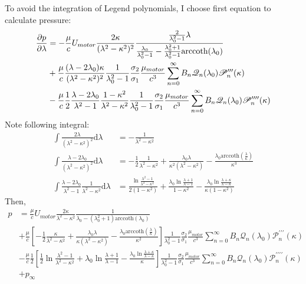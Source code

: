 \documentclass[fontsize=11pt, %
                             paper=a4, %
                             twoside, %
                             captions=tableheading,
                             index=totoc,
                             hyperref]{labbook}
\begin{document}
To avoid the integration of Legend polynomials, I choose first equation to calculate pressure:
\begin{equation}
\begin{aligned}
\frac{\partial p}{\partial \lambda}&=-\frac{\mu}{c}U_{motor}\frac{2\kappa}{(\lambda^2-\kappa^2)^2}\frac{\frac{2}{\lambda_0^2-1}\lambda}{\frac{\lambda_0}{\lambda_0^2-1}-\frac{\lambda_0^2+1}{\lambda_0^2-1}\mathrm{arccoth}(\lambda_0)}\\
&+\frac{\mu}{c}\frac{(\lambda-2\lambda_0)\kappa}{(\lambda^2-\kappa^2)^2}\frac{1}{\lambda_0^2-1}\frac{\sigma_2}{\sigma_1}\frac{\mu_{motor}}{c^3}\sum_{n=0}^\infty B_n \mathscr{Q}_n(\lambda_0)\mathscr{P}_n^{\prime\prime\prime}(\kappa)\\
&-\frac{\mu}{c}\frac{1}{2}\frac{\lambda-2\lambda_0}{\lambda^2-1}\frac{1-\kappa^2}{\lambda^2-\kappa^2}\frac{1}{\lambda_0^2-1}\frac{\sigma_2}{\sigma_1}\frac{\mu_{motor}}{c^3}\sum_{n=0}^\infty B_n \mathscr{Q}_n(\lambda_0)\mathscr{P}_n^{\prime\prime\prime\prime}(\kappa)
\end{aligned}
\end{equation}
Note following integral:
\begin{equation}
\begin{aligned}
\int\frac{2\lambda}{(\lambda^2-\kappa^2)^2}\mathrm{d}\lambda&=-\frac{1}{\lambda^2-\kappa^2}\\
\int\frac{\lambda-2\lambda_0}{(\lambda^2-\kappa^2)^2}\mathrm{d}\lambda&=-\frac{1}{2}\frac{1}{\lambda^2-\kappa^2}+\frac{\lambda_0\lambda}{\kappa^2(\lambda^2-\kappa^2)}-\frac{\lambda_0\mathrm{arccoth}(\frac{\lambda}{\kappa})}{\kappa^3}\\
\int\frac{\lambda-2\lambda_0}{\lambda^2-1}\frac{1}{\lambda^2-\kappa^2}\mathrm{d}\lambda&=
\frac{\ln\frac{\lambda^2-1}{\lambda^2-\kappa^2}}{2(1-\kappa^2)}+\frac{\lambda_0\ln\frac{\lambda+1}{\lambda-1}}{1-\kappa^2}-\frac{\lambda_0\ln\frac{\lambda+\kappa}{\lambda -\kappa}}{\kappa(1-\kappa^2)}
\end{aligned}
\end{equation}
Then,
\begin{equation}
\begin{aligned}
p&=\frac{\mu}{c}U_{motor}\frac{2\kappa}{\lambda^2-\kappa^2}\frac{1}{\lambda_0-(\lambda_0^2+1)\mathrm{arccoth}(\lambda_0)}\\
&+\frac{\mu}{c}
\left[-\frac{1}{2}\frac{\kappa}{\lambda^2-\kappa^2}+\frac{\lambda_0\lambda}{\kappa(\lambda^2-\kappa^2)}-\frac{\lambda_0\mathrm{arccoth}(\frac{\lambda}{\kappa})}{\kappa^2}\right]
\frac{1}{\lambda_0^2-1}\frac{\sigma_2}{\sigma_1}\frac{\mu_{motor}}{c^3}\sum_{n=0}^\infty B_n \mathscr{Q}_n(\lambda_0)\mathscr{P}_n^{\prime\prime\prime}(\kappa)\\
&-\frac{\mu}{c}\frac{1}{2}
\left[\frac{1}{2}\ln \frac{\lambda^2-1}{\lambda^2-\kappa^2}+\lambda_0\ln\frac{\lambda+1}{\lambda-1}-\frac{\lambda_0\ln\frac{\lambda+\kappa}{\lambda-\kappa}}{\kappa}\right]
\frac{1}{\lambda_0^2-1}\frac{\sigma_2}{\sigma_1}\frac{\mu_{motor}}{c^3}\sum_{n=0}^\infty B_n \mathscr{Q}_n(\lambda_0)\mathscr{P}_n^{\prime\prime\prime\prime}(\kappa)\\
&+p_\infty
\end{aligned}
\end{equation}
\end{document}
